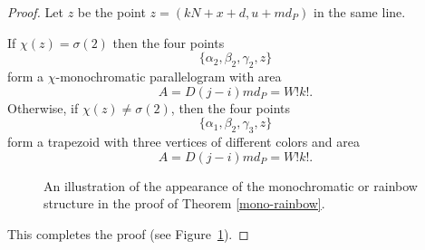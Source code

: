 \documentclass[a4paper, 11pt,reqno]{amsart}
\theoremstyle{definition}
\begin{document}
\begin{proof}
Let $z$ be the point $z=(kN+x+d,u+md_P)$ in the same line.

If $\chi (z)=\sigma (2)$ then the four points
\[
\{\alpha_2,\beta_2,\gamma_2,z\}
\]
form a $\chi$-monochromatic parallelogram with area
\[
A=D(j-i)md_P=W!k!.
\]
Otherwise, if $\chi (z)\neq \sigma(2)$, then the four points
\[
\{\alpha_1,\beta_2,\gamma_3, z\}
\]
form a trapezoid with three vertices of different colors and area
\[
A=D(j-i)md_P=W!k!.
\]
\begin{figure}[h]
\caption{An illustration of the appearance of the monochromatic or rainbow structure in the proof of Theorem \ref{mono-rainbow}.}
\label{fig:parallelogram-trapezoid}
\end{figure}
This completes the proof (see Figure~\ref{fig:parallelogram-trapezoid}).
\end{proof}
\end{document}
